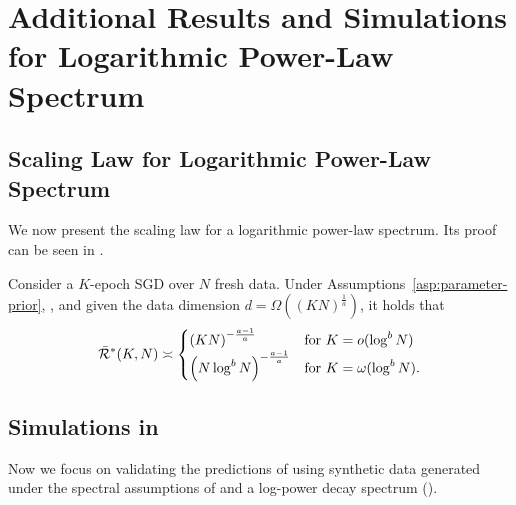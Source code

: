 \section{Additional Results and Simulations for Logarithmic Power-Law Spectrum}\label{app:log-spectrum}
\subsection{Scaling Law for Logarithmic Power-Law Spectrum}
We now present the scaling law for a logarithmic power-law spectrum.
Its proof can be seen in .
\begin{theorem} \label{thm:one-hot-log-scaling-law}
    Consider a $K$-epoch SGD over $N$ fresh data. Under Assumptions~\ref{asp:parameter-prior}, , and given the data dimension $d = \Omega((KN)^{\frac{1}{a}})$, it holds that
    \[
    \Bar{\mathcal{R}}^*(K,N) \asymp 
    \begin{cases}
         \left(KN\right)^{-\frac{a-1}{a}} & \text{for } K = o(\log^b N) \\
         {\left(N\log^b N\right)^{-\frac{a-1}{a}}}& \text{for } K = \omega(\log^b N).
    \end{cases}
    \]
\end{theorem}

\subsection{Simulations in }

Now we focus on validating the predictions of  using synthetic data generated under the spectral assumptions of  and a log-power decay spectrum ().

